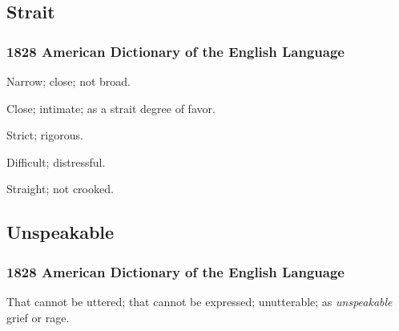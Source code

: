 	\subsection{Strait} %
		\label{STRAIT}
	
		\subsubsection{1828 American Dictionary of the English Language}
		
			\begin{compactitem}
				\item[1] Narrow; close; not broad.
				\item[2] Close; intimate; as a strait degree of favor.
				\item[3] Strict; rigorous.
				\item[4] Difficult; distressful.
				\item[5] Straight; not crooked.
			\end{compactitem}



	\subsection{Unspeakable} %
		\label{UNSPEAKABLE}
		
		\subsubsection{1828 American Dictionary of the English Language}

			\begin{compactitem}
				\item That cannot be uttered; that cannot be expressed; unutterable; as \textit{unspeakable} grief or rage.
			\end{compactitem}

